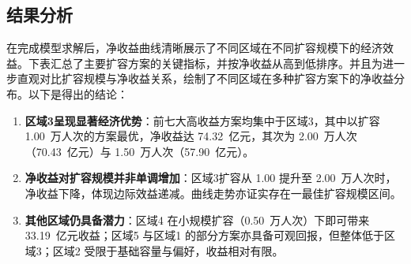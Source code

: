 \subsection[\hspace{-2pt}结果分析]{{\heiti{}\hspace{-8pt}结果分析}}\label{subsec:3-model-build}
在完成模型求解后，净收益曲线清晰展示了不同区域在不同扩容规模下的经济效益。下表汇总了主要扩容方案的关键指标，并按净收益从高到低排序。并且为进一步直观对比扩容规模与净收益关系，绘制了不同区域在多种扩容方案下的净收益分布。以下是得出的结论：
\begin{enumerate}
  \item \textbf{区域3呈现显著经济优势}：前七大高收益方案均集中于区域3，其中以扩容 1.00~万人次的方案最优，净收益达 74.32~亿元，其次为 2.00~万人次（70.43~亿元）与 1.50~万人次（57.90~亿元）。
  \item \textbf{净收益对扩容规模并非单调增加}：区域3扩容从 1.00 提升至 2.00~万人次时，净收益下降，体现边际效益递减。曲线走势亦证实存在一最佳扩容规模区间。
  \item \textbf{其他区域仍具备潜力}：区域4 在小规模扩容（0.50~万人次）下即可带来 33.19~亿元收益；区域5 与区域1 的部分方案亦具备可观回报，但整体低于区域3；区域2 受限于基础容量与偏好，收益相对有限。
\end{enumerate}

